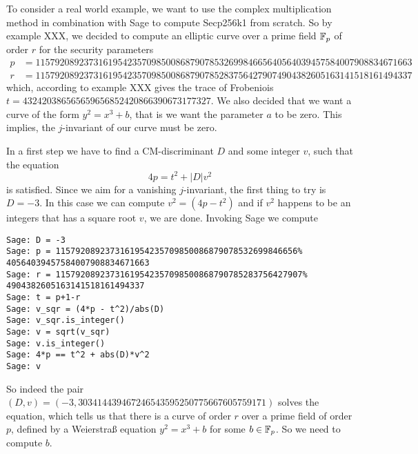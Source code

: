 \begin{example} To consider a real world example, we want to use the complex multiplication method in combination with Sage to compute Secp256k1 from scratch. So by example XXX, we decided to compute an elliptic curve over a prime field $\mathbb{F}_p$ of order $r$ for the security parameters 
\begin{align*}
p &= \scriptstyle 115792089237316195423570985008687907853269984665640564039457584007908834671663\\
r &= \scriptstyle 115792089237316195423570985008687907852837564279074904382605163141518161494337
\end{align*}
which, according to example XXX gives the trace of Frobeniois
$t = \scriptstyle 432420386565659656852420866390673177327$. We also decided that we want a curve of the form $y^2 = x^3 + b$, that is we want the parameter $a$ to be zero. This implies, the $j$-invariant of our curve must be zero.

In a first step we have to find a CM-discriminant $D$ and some integer $v$, such that the equation 
$$
4p = t^2 +|D|v^2
$$
is satisfied. Since we aim for a vanishing $j$-invariant, the first thing to try is $D=-3$. In this case we can compute $v^2 = (4p -t^2)$ and if $v^2$ happens to be an integers that has a square root $v$, we are done. Invoking Sage we compute
\begin{verbatim}
Sage: D = -3
Sage: p = 1157920892373161954235709850086879078532699846656%
40564039457584007908834671663
Sage: r = 11579208923731619542357098500868790785283756427907%
4904382605163141518161494337
Sage: t = p+1-r
Sage: v_sqr = (4*p - t^2)/abs(D)
Sage: v_sqr.is_integer()
Sage: v = sqrt(v_sqr)
Sage: v.is_integer()
Sage: 4*p == t^2 + abs(D)*v^2
Sage: v
\end{verbatim}
So indeed the pair $(D,v)=(-3, 303414439467246543595250775667605759171)$ solves the equation, which tells us that there is a curve of order $r$ over a prime field of order $p$, defined by a Weierstraß equation $y^2 = x^3 + b$ for some $b\in \mathbb{F}_p$. So we need to compute $b$.


\end{example}
